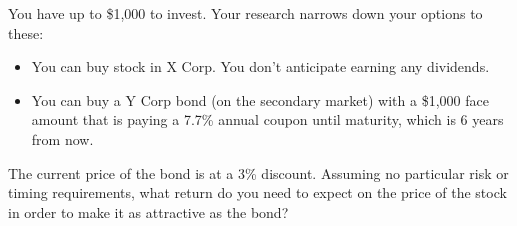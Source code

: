 \documentclass[12pt]{exam}
\begin{document}
\begin{questions}
    \question You have up to \$1,000 to invest.  Your research narrows down your options to these:
    \begin{itemize}
        \item You can buy stock in X Corp.  You don't anticipate earning any dividends.
        \item You can buy a Y Corp bond (on the secondary market) with a \$1,000 face amount that is paying a
        7.7\% annual coupon until maturity, which is 6 years from now.
    \end{itemize}
    The current price of the bond is at a 3\% discount.  Assuming no particular risk or timing requirements, what
    return do you need to expect on the price of the stock in order to make it as attractive as the bond?

\end{questions}
\end{document}
